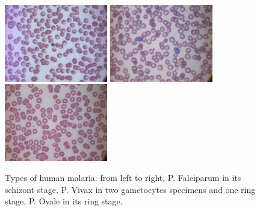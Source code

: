 \documentclass[sensors,review,submit,moreauthors,pdftex,10pt,a4paper]{mdpi}
\begin{document}
\iftrue
\begin{figure}[!t]
	\centering
	\includegraphics[width=4.5cm]{img/f3_Pfalciparum}
	\includegraphics[width=4.5cm]{img/f3_Pvivax}
	\includegraphics[width=4.5cm]{img/f3_Povale}
	\caption{\label{fig:malaria_types}Types of human malaria: from left to right, P. Falciparum in its schizont stage, P. Vivax in two gametocytes specimens and one ring stage, P. Ovale in its ring stage.}
\end{figure}
\fi
\end{document}
